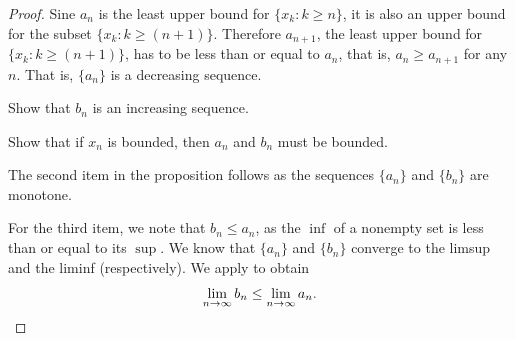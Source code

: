 \documentclass[12pt]{book}
\begin{document}
\begin{proof}
Sine $a_n$ is the least upper
bound for $\{ x_k : k \geq n \}$, it is also
an upper bound for the subset $\{ x_k : k \geq (n+1) \}$.
Therefore
$a_{n+1}$, the least upper bound for
$\{ x_k : k \geq (n+1) \}$, has to be less than or equal to $a_n$,
that is,
$a_n \geq a_{n+1}$ for any $n$.
That is,  $\{ a_n \}$ is a decreasing sequence.

\begin{exercise} 
Show that $b_n$ is an increasing sequence.
\end{exercise}

\begin{exercise}
Show that if $x_n$ is bounded, then $a_n$ and $b_n$ must be bounded.
\end{exercise}

The second item in the proposition follows as the sequences
$\{ a_n \}$ and $\{ b_n \}$ are monotone.

For the third item, we note that $b_n \leq a_n$, as the $\inf$ of a nonempty set
is less than or equal to its $\sup$.
We know that $\{ a_n \}$ and $\{ b_n \}$
converge to the limsup and the liminf (respectively).
We apply  to obtain
\begin{equation*}
\lim_{n\to \infty} b_n \leq \lim_{n\to \infty} a_n.  \qedhere
\end{equation*}
\end{proof}
\end{document}
